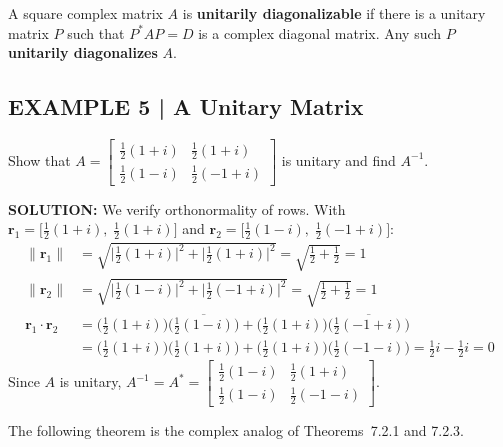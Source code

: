 \documentclass{article}
\begin{document}
\begin{tcolorbox}[colback=teal!4, colframe=teal!65!black,
  title={\textbf{Definition 3}}, boxrule=0.5mm, arc=3mm]
A square complex matrix $A$ is \textbf{unitarily diagonalizable} if there is a unitary
matrix $P$ such that $P^*AP = D$ is a complex diagonal matrix. Any such $P$
\textbf{unitarily diagonalizes} $A$.
\end{tcolorbox}

\subsection*{EXAMPLE 5 | A Unitary Matrix}

Show that
$A = \begin{bmatrix} \tfrac{1}{2}(1+i) & \tfrac{1}{2}(1+i) \\ \tfrac{1}{2}(1-i) & \tfrac{1}{2}(-1+i) \end{bmatrix}$
is unitary and find $A^{-1}$.

\textbf{SOLUTION:}
We verify orthonormality of rows. With
$\mathbf{r}_1 = \bigl[\tfrac{1}{2}(1+i),\;\tfrac{1}{2}(1+i)\bigr]$
and
$\mathbf{r}_2 = \bigl[\tfrac{1}{2}(1-i),\;\tfrac{1}{2}(-1+i)\bigr]$:
\begin{align*}
  \|\mathbf{r}_1\| &= \sqrt{\bigl|\tfrac{1}{2}(1+i)\bigr|^2+\bigl|\tfrac{1}{2}(1+i)\bigr|^2} = \sqrt{\tfrac{1}{2}+\tfrac{1}{2}} = 1 \\
  \|\mathbf{r}_2\| &= \sqrt{\bigl|\tfrac{1}{2}(1-i)\bigr|^2+\bigl|\tfrac{1}{2}(-1+i)\bigr|^2} = \sqrt{\tfrac{1}{2}+\tfrac{1}{2}} = 1 \\
  \mathbf{r}_1\cdot\mathbf{r}_2 &= \bigl(\tfrac{1}{2}(1+i)\bigr)\overline{\bigl(\tfrac{1}{2}(1-i)\bigr)}
                                    +\bigl(\tfrac{1}{2}(1+i)\bigr)\overline{\bigl(\tfrac{1}{2}(-1+i)\bigr)} \\
                                 &= \bigl(\tfrac{1}{2}(1+i)\bigr)\bigl(\tfrac{1}{2}(1+i)\bigr)
                                    +\bigl(\tfrac{1}{2}(1+i)\bigr)\bigl(\tfrac{1}{2}(-1-i)\bigr)
                                  = \tfrac{1}{2}i - \tfrac{1}{2}i = 0
\end{align*}
Since $A$ is unitary, $A^{-1} = A^* = \begin{bmatrix} \tfrac{1}{2}(1-i) & \tfrac{1}{2}(1+i) \\ \tfrac{1}{2}(1-i) & \tfrac{1}{2}(-1-i) \end{bmatrix}$.

The following theorem is the complex analog of Theorems~7.2.1 and 7.2.3.
\end{document}
